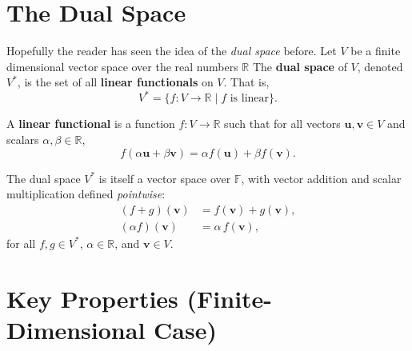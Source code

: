 \documentclass[11pt]{article}
\begin{document}
\newpage


\section*{The Dual Space}

Hopefully the reader has seen the idea of the \emph{dual space} before. Let $ V $ be a finite dimensional vector space over the real numbers $ \mathbb{R} $  
The \textbf{dual space} of $ V $, denoted $ V^* $, is the set of all \textbf{linear functionals} on $ V $. That is,
\[
V^* = \{ f: V \to \mathbb{R} \mid f \text{ is linear} \}.
\]

A \textbf{linear functional} is a function $ f: V \to \mathbb{R} $ such that for all vectors $ \mathbf{u}, \mathbf{v} \in V $ and scalars $ \alpha, \beta \in \mathbb{R} $,
\[
f(\alpha \mathbf{u} + \beta \mathbf{v}) = \alpha f(\mathbf{u}) + \beta f(\mathbf{v}).
\]

The dual space $ V^* $ is itself a vector space over $ \mathbb{F} $, with vector addition and scalar multiplication defined \textit{pointwise}:
\begin{align*}
(f + g)(\mathbf{v}) &= f(\mathbf{v}) + g(\mathbf{v}), \\
(\alpha f)(\mathbf{v}) &= \alpha \, f(\mathbf{v}),
\end{align*}
for all $ f, g \in V^* $, $ \alpha \in \mathbb{R} $, and $ \mathbf{v} \in V $.

\section*{Key Properties (Finite-Dimensional Case)}
\end{document}
